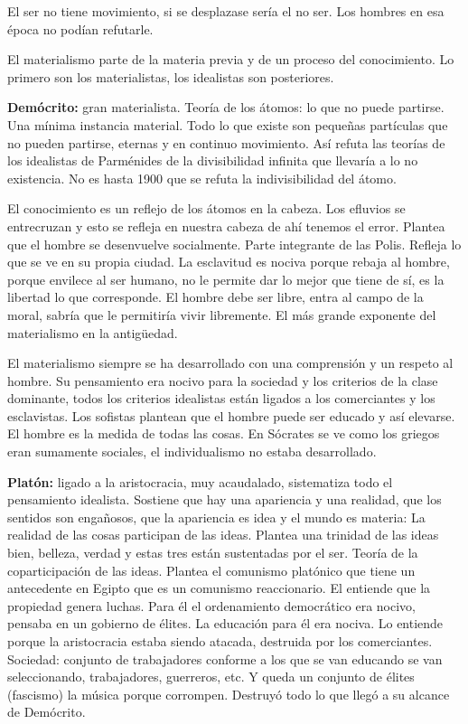\documentclass[
  a4paper,
]{article}
\begin{document}
El ser no tiene movimiento, si se desplazase sería el no ser. Los
hombres en esa época no podían refutarle.

El materialismo parte de la materia previa y de un proceso del
conocimiento. Lo primero son los materialistas, los idealistas son
posteriores.

\textbf{Demócrito:} gran materialista. Teoría de los átomos: lo que no
puede partirse. Una mínima instancia material. Todo lo que existe son
pequeñas partículas que no pueden partirse, eternas y en continuo
movimiento. Así refuta las teorías de los idealistas de Parménides de la
divisibilidad infinita que llevaría a lo no existencia. No es hasta 1900
que se refuta la indivisibilidad del átomo.

El conocimiento es un reflejo de los átomos en la cabeza. Los efluvios
se entrecruzan y esto se refleja en nuestra cabeza de ahí tenemos el
error. Plantea que el hombre se desenvuelve socialmente. Parte
integrante de las Polis. Refleja lo que se ve en su propia ciudad. La
esclavitud es nociva porque rebaja al hombre, porque envilece al ser
humano, no le permite dar lo mejor que tiene de sí, es la libertad lo
que corresponde. El hombre debe ser libre, entra al campo de la moral,
sabría que le permitiría vivir libremente. El más grande exponente del
materialismo en la antigüedad.

El materialismo siempre se ha desarrollado con una comprensión y un
respeto al hombre. Su pensamiento era nocivo para la sociedad y los
criterios de la clase dominante, todos los criterios idealistas están
ligados a los comerciantes y los esclavistas. Los sofistas plantean que
el hombre puede ser educado y así elevarse. El hombre es la medida de
todas las cosas. En Sócrates se ve como los griegos eran sumamente
sociales, el individualismo no estaba desarrollado.

\textbf{Platón:} ligado a la aristocracia, muy acaudalado, sistematiza
todo el pensamiento idealista. Sostiene que hay una apariencia y una
realidad, que los sentidos son engañosos, que la apariencia es idea y el
mundo es materia: La realidad de las cosas participan de las ideas.
Plantea una trinidad de las ideas bien, belleza, verdad y estas tres
están sustentadas por el ser. Teoría de la coparticipación de las ideas.
Plantea el comunismo platónico que tiene un antecedente en Egipto que es
un comunismo reaccionario. El entiende que la propiedad genera luchas.
Para él el ordenamiento democrático era nocivo, pensaba en un gobierno
de élites. La educación para él era nociva. Lo entiende porque la
aristocracia estaba siendo atacada, destruida por los comerciantes.
Sociedad: conjunto de trabajadores conforme a los que se van educando se
van seleccionando, trabajadores, guerreros, etc. Y queda un conjunto de
élites (fascismo) la música porque corrompen. Destruyó todo lo que llegó
a su alcance de Demócrito.
\end{document}
